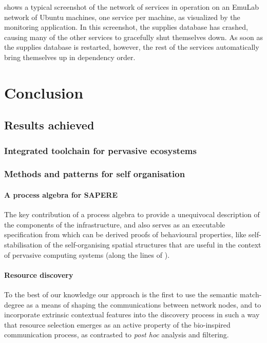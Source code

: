 \documentclass[12pt,a4paper,twoside,openright]{book}
\begin{document}
 shows a typical screenshot of the network of services in operation on an EmuLab network of Ubuntu machines, one service per machine, as visualized by the monitoring application.
%
In this screenshot, the supplies database has crashed, causing many of the other services to gracefully shut themselves down.  As soon as the supplies database is restarted, however, the rest of the services automatically bring themselves up in dependency order.

\part{Conclusion}
\chapter{Results achieved}

\section{Integrated toolchain for pervasive ecosystems}

\section{Methods and patterns for self organisation}

\subsection{A process algebra for SAPERE}

The key contribution of a process algebra to provide a unequivocal description of the components of the infrastructure, and also serves as an executable specification from which can be derived proofs of behavioural properties, like self-stabilisation of the self-organising spatial structures that are useful in the context of pervasive computing systems (along the lines of \cite{V-SCW2013}).

\subsection{Resource discovery}
To the best of our knowledge our approach is the first to use the semantic match-degree as a means of shaping the communications between network nodes, and to incorporate extrinsic contextual features into the discovery process in such a way that resource selection emerges as an active property of the bio-inspired communication process, as contrasted to \emph{post hoc} analysis and filtering.
\end{document}
